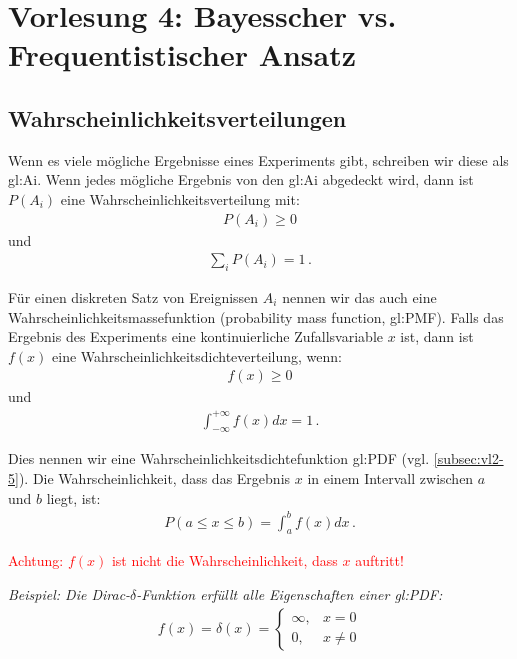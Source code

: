 \section{Vorlesung 4: Bayesscher vs. Frequentistischer Ansatz}
\label{sec:vl4}




\subsection{Wahrscheinlichkeitsverteilungen}
\label{subsec:vl4-4}

Wenn es viele m\"ogliche Ergebnisse eines Experiments gibt, schreiben wir diese als \gls{gl:Ai}. Wenn jedes m\"ogliche Ergebnis von den \gls{gl:Ai} abgedeckt wird, dann ist $P ( A_i )$ eine Wahrscheinlichkeitsverteilung mit:
\begin{align}
P ( A_i ) \geq 0
\label{eq:vl4-11}
\end{align}
und
\begin{align}
\sum_i P ( A_i ) = 1\,.
\label{eq:vl4-12}
\end{align}

F\"ur einen diskreten Satz von Ereignissen $A_i$ nennen wir das auch eine Wahrscheinlichkeitsmassefunktion (probability mass function, \gls{gl:PMF}). Falls das Ergebnis des Experiments eine kontinuierliche Zufallsvariable $x$ ist, dann ist $f ( x )$ eine Wahrscheinlichkeitsdichteverteilung, wenn:
\begin{align}
f ( x ) \geq 0
\label{eq:vl4-13}
\end{align}
und 
\begin{align}
\int_{-\infty}^{+\infty} f ( x ) dx = 1\,.
\label{eq:vl4-14}
\end{align}

Dies nennen wir eine Wahrscheinlichkeitsdichtefunktion \gls{gl:PDF} (vgl. \cref{subsec:vl2-5}).
Die Wahrscheinlichkeit, dass das Ergebnis $x$ in einem Intervall zwischen $a$ und $b$ liegt, ist:
\begin{align}
P ( a \leq x \leq b ) = \int_a^b f ( x ) dx\,.
\label{eq:vl4-15}
\end{align}

\begin{center}
\textcolor{red}{Achtung: $f ( x )$ ist nicht die Wahrscheinlichkeit, dass $x$ auftritt!}
\end{center}

\textit{Beispiel: Die Dirac-$\delta$-Funktion erf\"ullt alle Eigenschaften einer \gls{gl:PDF}:}
\begin{align}
f ( x ) = \delta ( x ) = 
    \begin{cases}
        \infty,& x = 0\\
        0,& x \neq 0
    \end{cases}       
\label{eq:vl4-16}
\end{align}

